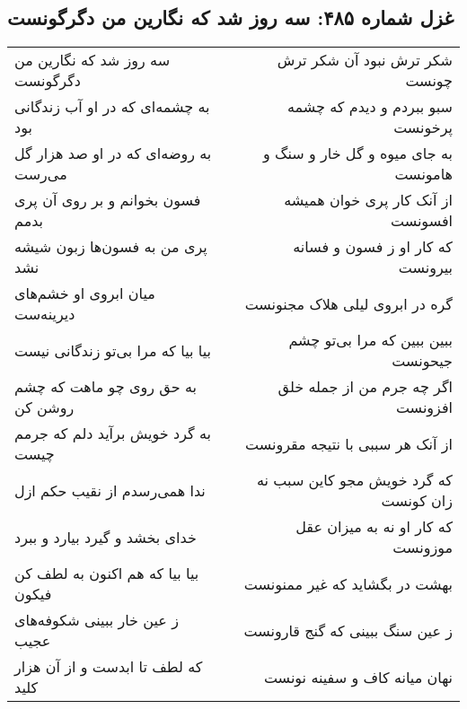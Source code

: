 \begin{center}
\section*{غزل شماره ۴۸۵: سه روز شد که نگارین من دگرگونست}
\label{sec:0485}
\begin{longtable}{l p{0.5cm} r}
سه روز شد که نگارین من دگرگونست
&&
شکر ترش نبود آن شکر ترش چونست
\\
به چشمه‌ای که در او آب زندگانی بود
&&
سبو ببردم و دیدم که چشمه پرخونست
\\
به روضه‌ای که در او صد هزار گل می‌رست
&&
به جای میوه و گل خار و سنگ و هامونست
\\
فسون بخوانم و بر روی آن پری بدمم
&&
از آنک کار پری خوان همیشه افسونست
\\
پری من به فسون‌ها زبون شیشه نشد
&&
که کار او ز فسون و فسانه بیرونست
\\
میان ابروی او خشم‌های دیرینه‌ست
&&
گره در ابروی لیلی هلاک مجنونست
\\
بیا بیا که مرا بی‌تو زندگانی نیست
&&
ببین ببین که مرا بی‌تو چشم جیحونست
\\
به حق روی چو ماهت که چشم روشن کن
&&
اگر چه جرم من از جمله خلق افزونست
\\
به گرد خویش برآید دلم که جرمم چیست
&&
از آنک هر سببی با نتیجه مقرونست
\\
ندا همی‌رسدم از نقیب حکم ازل
&&
که گرد خویش مجو کاین سبب نه زان کونست
\\
خدای بخشد و گیرد بیارد و ببرد
&&
که کار او نه به میزان عقل موزونست
\\
بیا بیا که هم اکنون به لطف کن فیکون
&&
بهشت در بگشاید که غیر ممنونست
\\
ز عین خار ببینی شکوفه‌های عجیب
&&
ز عین سنگ ببینی که گنج قارونست
\\
که لطف تا ابدست و از آن هزار کلید
&&
نهان میانه کاف و سفینه نونست
\\
\end{longtable}
\end{center}
